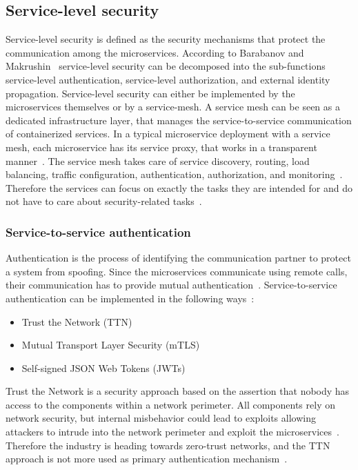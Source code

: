 \subsection{Service-level security}
Service-level security is defined as the security mechanisms that protect the communication among the microservices.
According to Barabanov and Makrushin~\cite{barabanov2020authentication} service-level security can be decomposed into the sub-functions service-level authentication, service-level authorization, and external identity propagation.
Service-level security can either be implemented by the microservices themselves or by a service-mesh.
A service mesh can be seen as a dedicated infrastructure layer, that manages the service-to-service communication of containerized services.
In a typical microservice deployment with a service mesh, each microservice has its service proxy, that works in a transparent manner~\cite{dias2020microservices}.
The service mesh takes care of service discovery, routing, load balancing, traffic configuration, authentication, authorization, and monitoring~\cite{chandramouli2019microservices}.
Therefore the services can focus on exactly the tasks they are intended for and do not have to care about security-related tasks~\cite{dias2020microservices}.

\subsubsection{Service-to-service authentication} 
\label{sec:service-to-service-authentication}
Authentication is the process of identifying the communication partner to protect a system from spoofing.
Since the microservices communicate using remote calls, their communication has to provide mutual authentication~\cite{dias2020microservices}.
Service-to-service authentication can be implemented in the following ways~\cite{dias2020microservices}:
\begin{itemize}
    \item Trust the Network (TTN)
    \item Mutual Transport Layer Security (mTLS)
    \item Self-signed JSON Web Tokens (JWTs)
\end{itemize}
Trust the Network is a security approach based on the assertion that nobody has access to the components within a network perimeter.
All components rely on network security, but internal misbehavior could lead to exploits allowing attackers to intrude into the network perimeter and exploit the microservices~\cite{zaheer2019eztrust}. 
Therefore the industry is heading towards zero-trust networks, and the TTN approach is not more used as primary authentication mechanism~\cite{barabanov2020authentication}.

